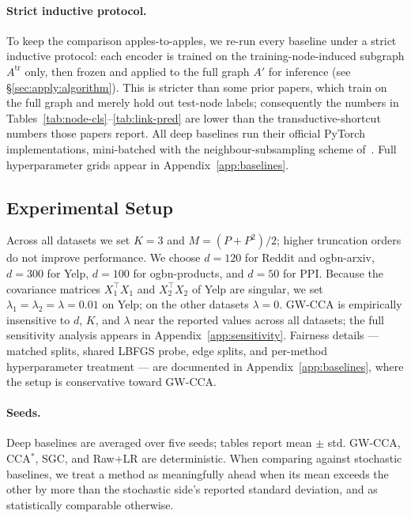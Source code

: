 \documentclass{article}
\begin{document}
\paragraph{Strict inductive protocol.}
To keep the comparison apples-to-apples, we re-run every baseline under a
strict inductive protocol: each encoder is trained on the
training-node-induced subgraph $A^{\text{tr}}$ only, then frozen and applied
to the full graph $A'$ for inference (see \S\ref{sec:apply:algorithm}).
This is stricter than some prior papers, which train on the full graph and
merely hold out test-node labels; consequently the numbers in
Tables~\ref{tab:node-cls}--\ref{tab:link-pred} are lower than the
transductive-shortcut numbers those papers report. All deep baselines run
their official PyTorch implementations, mini-batched with the
neighbour-subsampling scheme of~\citet{hamilton2017inductive}. Full
hyperparameter grids appear in Appendix~\ref{app:baselines}.

\subsection{Experimental Setup}
Across all datasets we set $K = 3$ and $M = (P + P^2)/2$; higher truncation
orders do not improve performance. We choose $d = 120$ for Reddit and
ogbn-arxiv, $d = 300$ for Yelp, $d = 100$ for ogbn-products, and $d = 50$
for PPI. Because the covariance matrices $X_1^\top X_1$ and $X_2^\top X_2$
of Yelp are singular, we set $\lambda_1 = \lambda_2 = \lambda = 0.01$ on
Yelp; on the other datasets $\lambda = 0$. GW-CCA is empirically
insensitive to $d$, $K$, and $\lambda$ near the reported values across
all datasets; the full sensitivity analysis appears in
Appendix~\ref{app:sensitivity}. Fairness details --- matched splits,
shared LBFGS probe, edge splits, and per-method hyperparameter treatment
--- are documented in Appendix~\ref{app:baselines}, where the setup is
conservative toward GW-CCA.

\paragraph{Seeds.}
Deep baselines are averaged over five seeds; tables report mean $\pm$ std.
GW-CCA, CCA$^\ast$, SGC, and Raw+LR are deterministic. When comparing
against stochastic baselines, we treat a method as meaningfully ahead
when its mean exceeds the other by more than the stochastic side's
reported standard deviation, and as statistically comparable otherwise.
\end{document}
